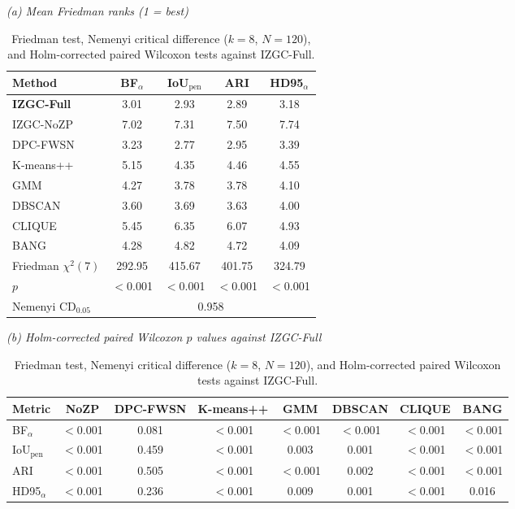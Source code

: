\begin{table}[tbp]
\centering
\caption{Friedman test, Nemenyi critical difference ($k=8$, $N=120$), and Holm-corrected paired Wilcoxon tests against IZGC-Full.}
\label{tab:S11_significance}
\scriptsize
\setlength{\tabcolsep}{4pt}
\renewcommand{\arraystretch}{0.95}
\noindent\textit{(a) Mean Friedman ranks (1 = best)}
\par\vspace{2pt}
\begin{tabular*}{0.82\textwidth}{@{\extracolsep{\fill}}lcccc@{}}
\toprule
Method & BF$_{\alpha}$ & IoU$_{\mathrm{pen}}$ & ARI & HD95$_{\alpha}$ \\
\midrule
\textbf{IZGC-Full} & 3.01 & 2.93 & 2.89 & 3.18 \\
IZGC-NoZP & 7.02 & 7.31 & 7.50 & 7.74 \\
DPC-FWSN & 3.23 & 2.77 & 2.95 & 3.39 \\
K-means++ & 5.15 & 4.35 & 4.46 & 4.55 \\
GMM & 4.27 & 3.78 & 3.78 & 4.10 \\
DBSCAN & 3.60 & 3.69 & 3.63 & 4.00 \\
CLIQUE & 5.45 & 6.35 & 6.07 & 4.93 \\
BANG & 4.28 & 4.82 & 4.72 & 4.09 \\
\midrule
Friedman $\chi^2(7)$ & 292.95 & 415.67 & 401.75 & 324.79 \\
$p$ & $<$0.001 & $<$0.001 & $<$0.001 & $<$0.001 \\
Nemenyi CD$_{0.05}$ & \multicolumn{4}{c}{0.958} \\
\bottomrule
\end{tabular*}

\vspace{6pt}
\noindent\textit{(b) Holm-corrected paired Wilcoxon $p$ values against IZGC-Full}
\par\vspace{2pt}
\begin{tabular*}{\textwidth}{@{\extracolsep{\fill}}lccccccc@{}}
\toprule
Metric & NoZP & DPC-FWSN & K-means++ & GMM & DBSCAN & CLIQUE & BANG \\
\midrule
BF$_{\alpha}$ & $<$0.001 & 0.081 & $<$0.001 & $<$0.001 & $<$0.001 & $<$0.001 & $<$0.001 \\
IoU$_{\mathrm{pen}}$ & $<$0.001 & 0.459 & $<$0.001 & 0.003 & 0.001 & $<$0.001 & $<$0.001 \\
ARI & $<$0.001 & 0.505 & $<$0.001 & $<$0.001 & 0.002 & $<$0.001 & $<$0.001 \\
HD95$_{\alpha}$ & $<$0.001 & 0.236 & $<$0.001 & 0.009 & 0.001 & $<$0.001 & 0.016 \\
\bottomrule
\end{tabular*}


\end{table}
